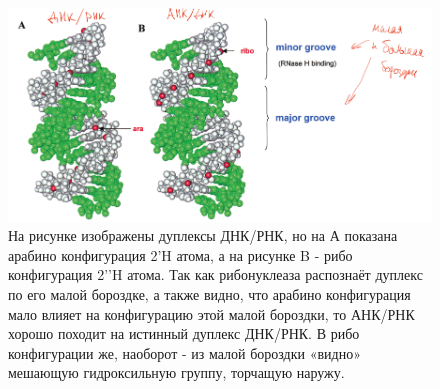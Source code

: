 	\begin{figure}[H]
		\centering
		\includegraphics[scale = 0.4]{Pictures/4_11}
		\caption{На рисунке изображены дуплексы ДНК/РНК, но на А показана арабино конфигурация 2’H атома, а на рисунке B - рибо конфигурация 2’’H атома.
			Так как рибонуклеаза распознаёт дуплекс по его малой бороздке, а также видно, что арабино конфигурация мало влияет на конфигурацию этой малой бороздки, то АНК/РНК хорошо походит на истинный дуплекс ДНК/РНК. В рибо конфигурации же, наоборот - из малой бороздки «видно» мешающую гидроксильную группу, торчащую наружу.}
	\end{figure}
	